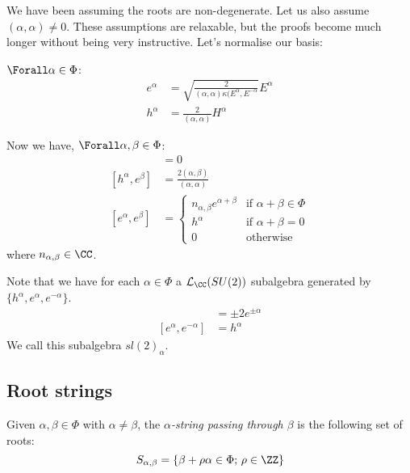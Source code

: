 \documentclass{jknotes}
\begin{document}
We have been assuming the roots are non-degenerate. Let us also assume \((\alpha,\alpha) \ne 0\). These assumptions are relaxable, but the proofs become much longer without being very instructive. Let's normalise our basis:
\begin{defn}
    \(\Forall \alpha \in \Phi\):
    \begin{align}
        e^\alpha &= \sqrt{\frac{2}{(\alpha,\alpha)\kappa(E^\alpha,E^{-\alpha}}}E^\alpha \\
        h^\alpha &= \frac{2}{(\alpha,\alpha)}H^\alpha
    \end{align}
\end{defn}

Now we have, \(\Forall \alpha,\beta \in \Phi\):
\begin{align}
    [h^\alpha,h^\beta] &= 0 \\
    [h^\alpha,e^\beta] &= \frac{2(\alpha,\beta)}{(\alpha,\alpha)} \\
    [e^\alpha,e^\beta] &= 
    \begin{cases}
        n_{\alpha,\beta}e^{\alpha+\beta} & \text{if } \alpha+\beta \in \Phi \\
        h^\alpha & \text{if } \alpha+\beta=0 \\
        0 & \text{otherwise}
    \end{cases}
\end{align}
where \(n_{\alpha,\beta} \in \CC\).

Note that we have for each \(\alpha \in \Phi\) a \(\mathcal{L}_\CC(SU(2))\) subalgebra generated by \(\{h^\alpha,e^{\alpha},e^{-\alpha}\}\).
\begin{align}
    [h^\alpha,e^{\pm\alpha}] &= \pm2e^{\pm\alpha} \\
    [e^\alpha,e^{-\alpha}] &= h^\alpha
\end{align}
We call this subalgebra \(sl(2)_\alpha\).

\subsection{Root strings}

\begin{defn}
    Given \(\alpha,\beta\in \Phi\) with \(\alpha\ne\beta\), the \emph{\(\alpha\)-string passing through \(\beta\)} is the following set of roots:
    \begin{equation}
        S_{\alpha,\beta} = \{\beta+\rho \alpha \in \Phi;\,\rho\in\ZZ\}
    \end{equation}
\end{defn}
\end{document}
